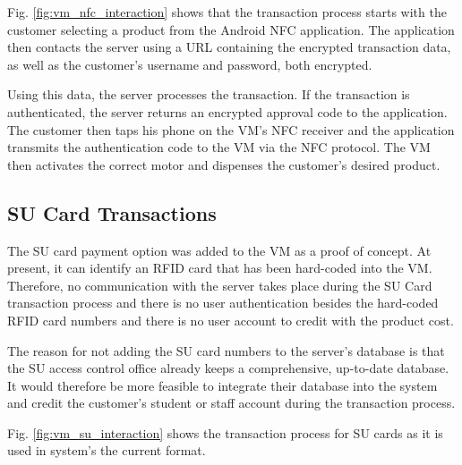 Fig. \ref{fig:vm_nfc_interaction} shows that the transaction process starts with the
customer selecting a product from the Android NFC application. The application
then contacts the server using a URL containing the encrypted transaction data,
as well as the customer's username and password, both encrypted.

Using this data, the server processes the transaction. If the transaction is
authenticated, the server returns an encrypted approval code to the application.
The customer then taps his phone on the VM's NFC receiver
and the application transmits the authentication code to the VM
via the NFC protocol. The VM then activates the correct motor and dispenses the
customer's desired product.

\subsection{SU Card Transactions}
\label{sec:su-card}

The SU card payment option was added to the VM as a proof of concept. At present, it can
identify an RFID card that has been hard-coded into the VM. Therefore, no communication
with the server takes place during the SU Card transaction process and there is
no user authentication besides the hard-coded RFID card numbers and there is no user
account to credit with the product cost.

The reason for not adding the SU card numbers to the server's database is that
the SU access control office already keeps a comprehensive, up-to-date database. It
would therefore be more feasible to integrate their database into the system and credit
the customer's student or staff account during the transaction process.

Fig. \ref{fig:vm_su_interaction} shows the transaction process for SU cards as it is
used in system's the current format. 

